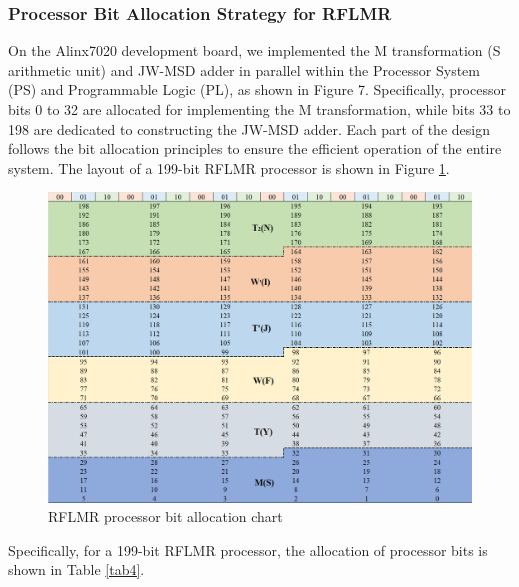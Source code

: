 \documentclass[electronics,article,accept,pdftex,moreauthors]{Definitions/mdpi}
\begin{document}
\subsubsection{Processor Bit Allocation Strategy for RFLMR}
On the Alinx7020 development board, we implemented the M transformation (S arithmetic unit) and JW-MSD adder in parallel within the Processor System (PS) and Programmable Logic (PL), as shown in Figure 7. Specifically, processor bits 0 to 32 are allocated for implementing the M transformation, while bits 33 to 198 are dedicated to constructing the JW-MSD adder. Each part of the design follows the bit allocation principles to ensure the efficient operation of the entire system. The layout of a 199-bit RFLMR processor is shown in Figure \ref{fig7}.
\begin{figure}[H]
    \includegraphics[scale=0.5]{./images/7.png}
    \caption{RFLMR processor bit allocation chart}
    \label{fig7}
\end{figure}
Specifically, for a 199-bit RFLMR processor, the allocation of processor bits is shown in Table \ref{tab4}.
\begin{table}[H]
    \caption{RFLMR processor bit allocation table}
    \label{tab4}
    \renewcommand{\arraystretch}{1.8}
        \captionsetup{justification=centering} 
\end{table}
\end{document}
